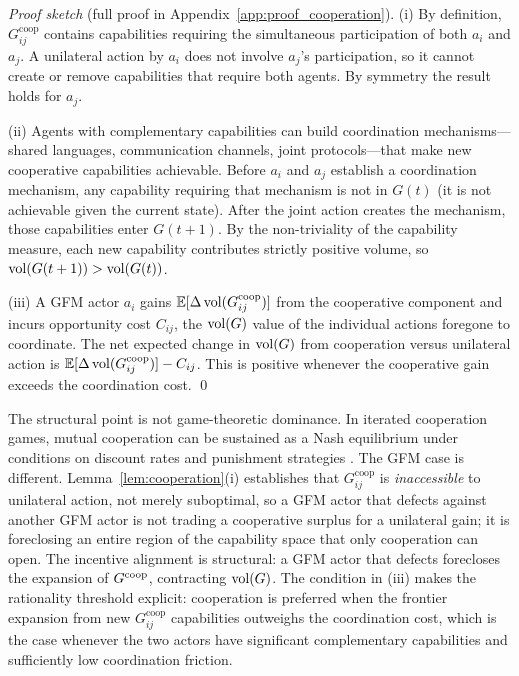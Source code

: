 \emph{Proof sketch} (full proof in Appendix~\ref{app:proof_cooperation}).
(i) By definition, $G^{\mathrm{coop}}_{ij}$ contains capabilities requiring the
simultaneous participation of both $a_i$ and $a_j$. A unilateral action by
$a_i$ does not involve $a_j$'s participation, so it cannot create or remove
capabilities that require both agents. By symmetry the result holds for $a_j$.

(ii) Agents with complementary capabilities can build coordination
mechanisms---shared languages, communication channels, joint protocols---that
make new cooperative capabilities achievable. Before $a_i$ and $a_j$ establish
a coordination mechanism, any capability requiring that mechanism is not in
$G(t)$ (it is not achievable given the current state). After the joint action
creates the mechanism, those capabilities enter $G(t+1)$. By the non-triviality
of the capability measure, each new capability contributes strictly positive
volume, so $\operatorname{vol}(G(t+1)) > \operatorname{vol}(G(t))$.

(iii) A GFM actor $a_i$ gains $\mathbb{E}[\Delta \operatorname{vol}(G^{\mathrm{coop}}_{ij})]$
from the cooperative component and incurs opportunity cost $C_{ij}$, the
$\operatorname{vol}(G)$ value of the individual actions foregone to coordinate. The net
expected change in $\operatorname{vol}(G)$ from cooperation versus unilateral action is
$\mathbb{E}[\Delta \operatorname{vol}(G^{\mathrm{coop}}_{ij})] - C_{ij}$. This is positive
whenever the cooperative gain exceeds the coordination cost. \qed

The structural point is not game-theoretic dominance. In iterated cooperation
games, mutual cooperation can be sustained as a Nash equilibrium under
conditions on discount rates and punishment strategies
\citep{axelrod1984evolution}. The GFM case is different.
Lemma~\ref{lem:cooperation}(i) establishes that $G^{\mathrm{coop}}_{ij}$ is
\emph{inaccessible} to unilateral action, not merely suboptimal, so a GFM actor
that defects against another GFM actor is not trading a cooperative surplus for
a unilateral gain; it is foreclosing an entire region of the capability space
that only cooperation can open. The incentive alignment is structural: a GFM
actor that defects forecloses the expansion of $G^{\mathrm{coop}}$, contracting $\operatorname{vol}(G)$.
The condition in (iii) makes the rationality threshold explicit: cooperation is
preferred when the frontier expansion from new $G^{\mathrm{coop}}_{ij}$
capabilities outweighs the coordination cost, which is the case whenever the
two actors have significant complementary capabilities and sufficiently low
coordination friction.

